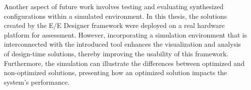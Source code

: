      Another aspect of future work involves testing and evaluating synthesized configurations within a simulated environment. In this thesis, the solutions created by the E/E Designer framework were deployed on a real hardware platform for assessment. However, incorporating a simulation environment that is interconnected with the introduced tool enhances the visualization and analysis of design-time solutions, thereby improving the usability of this framework. Furthermore, the simulation can illustrate the differences between optimized and non-optimized solutions, presenting how an optimized solution impacts the system's performance.
          

     
